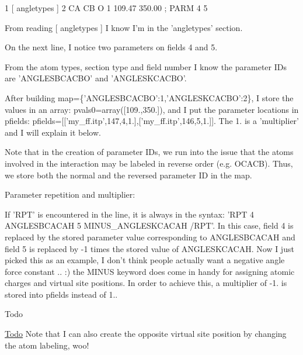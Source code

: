 \begin{DoxyCode}
1 [ angletypes ]
2 CA   CB   O   1   109.47  350.00  ; PARM 4 5
\end{DoxyCode}


From reading {\ttfamily \mbox{[} angletypes \mbox{]}} I know I'm in the 'angletypes' section.

On the next line, I notice two parameters on fields 4 and 5.

From the atom types, section type and field number I know the parameter I\-Ds are {\ttfamily 'A\-N\-G\-L\-E\-S\-B\-C\-A\-C\-B\-O'} and {\ttfamily 'A\-N\-G\-L\-E\-S\-K\-C\-A\-C\-B\-O'}.

After building {\ttfamily map=\{'A\-N\-G\-L\-E\-S\-B\-C\-A\-C\-B\-O'\-:1,'A\-N\-G\-L\-E\-S\-K\-C\-A\-C\-B\-O'\-:2\}}, I store the values in an array\-: {\ttfamily pvals0=array(\mbox{[}109.,350.\mbox{]})}, and I put the parameter locations in pfields\-: {\ttfamily pfields=\mbox{[}\mbox{[}'my\-\_\-ff.\-itp',147,4,1.\mbox{]},\mbox{[}'my\-\_\-ff.\-itp',146,5,1.\mbox{]}\mbox{]}}. The 1. is a 'multiplier' and I will explain it below.

Note that in the creation of parameter I\-Ds, we run into the issue that the atoms involved in the interaction may be labeled in reverse order (e.\-g. {\ttfamily O\-C\-A\-C\-B}). Thus, we store both the normal and the reversed parameter I\-D in the map.

Parameter repetition and multiplier\-:

If {\ttfamily 'R\-P\-T'} is encountered in the line, it is always in the syntax\-: {\ttfamily 'R\-P\-T 4 A\-N\-G\-L\-E\-S\-B\-C\-A\-C\-A\-H 5 M\-I\-N\-U\-S\-\_\-\-A\-N\-G\-L\-E\-S\-K\-C\-A\-C\-A\-H /\-R\-P\-T'}. In this case, field 4 is replaced by the stored parameter value corresponding to {\ttfamily A\-N\-G\-L\-E\-S\-B\-C\-A\-C\-A\-H} and field 5 is replaced by -\/1 times the stored value of {\ttfamily A\-N\-G\-L\-E\-S\-K\-C\-A\-C\-A\-H}. Now I just picked this as an example, I don't think people actually want a negative angle force constant .. \-:) the {\ttfamily M\-I\-N\-U\-S} keyword does come in handy for assigning atomic charges and virtual site positions. In order to achieve this, a multiplier of -\/1. is stored into pfields instead of 1..

\begin{DoxyRefDesc}{Todo}
\item[\hyperlink{todo__todo000011}{Todo}]Note that I can also create the opposite virtual site position by changing the atom labeling, woo!\end{DoxyRefDesc}


